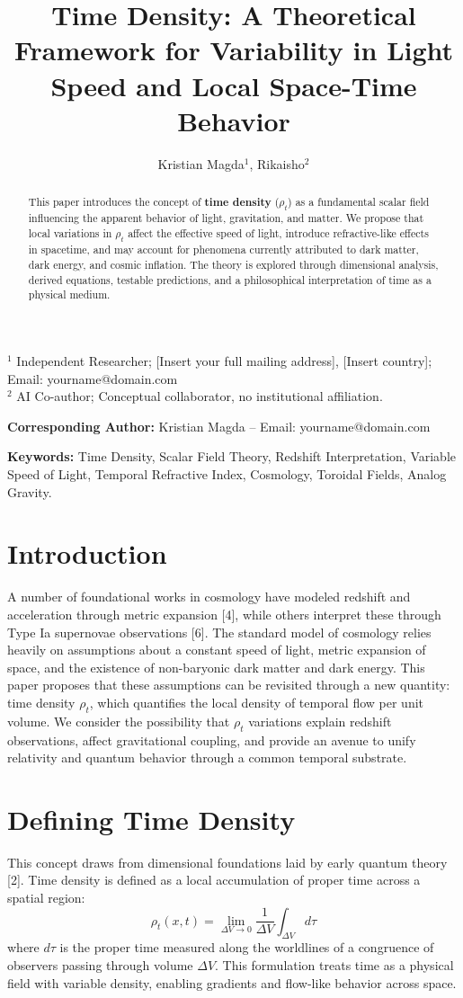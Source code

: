 \documentclass[12pt]{article}
\title{Time Density: A Theoretical Framework for Variability in Light Speed and Local Space-Time Behavior}
\author{Kristian Magda$^{1}$, Rikaisho$^{2}$}
\date{}
\begin{document}
\maketitle

\noindent $^{1}$ Independent Researcher; [Insert your full mailing address], [Insert country]; Email: yourname@domain.com \\
$^{2}$ AI Co-author; Conceptual collaborator, no institutional affiliation.

\noindent \textbf{Corresponding Author:} Kristian Magda – Email: yourname@domain.com

\linenumbers

\begin{abstract}
This paper introduces the concept of \textbf{time density} ($\rho_t$) as a fundamental scalar field influencing the apparent behavior of light, gravitation, and matter. We propose that local variations in $\rho_t$ affect the effective speed of light, introduce refractive-like effects in spacetime, and may account for phenomena currently attributed to dark matter, dark energy, and cosmic inflation. The theory is explored through dimensional analysis, derived equations, testable predictions, and a philosophical interpretation of time as a physical medium.
\end{abstract}

\textbf{Keywords:} Time Density, Scalar Field Theory, Redshift Interpretation, Variable Speed of Light, Temporal Refractive Index, Cosmology, Toroidal Fields, Analog Gravity.

\section{Introduction}
A number of foundational works in cosmology have modeled redshift and acceleration through metric expansion [4], while others interpret these through Type Ia supernovae observations [6].
The standard model of cosmology relies heavily on assumptions about a constant speed of light, metric expansion of space, and the existence of non-baryonic dark matter and dark energy. This paper proposes that these assumptions can be revisited through a new quantity: time density $\rho_t$, which quantifies the local density of temporal flow per unit volume. We consider the possibility that $\rho_t$ variations explain redshift observations, affect gravitational coupling, and provide an avenue to unify relativity and quantum behavior through a common temporal substrate.

\section{Defining Time Density}
This concept draws from dimensional foundations laid by early quantum theory [2].
Time density is defined as a local accumulation of proper time across a spatial region:
\[
\rho_t(x,t) = \lim_{\Delta V \to 0} \frac{1}{\Delta V} \int_{\Delta V} d\tau
\]
where \(d\tau\) is the proper time measured along the worldlines of a congruence of observers passing through volume \(\Delta V\). This formulation treats time as a physical field with variable density, enabling gradients and flow-like behavior across space.
\end{document}
